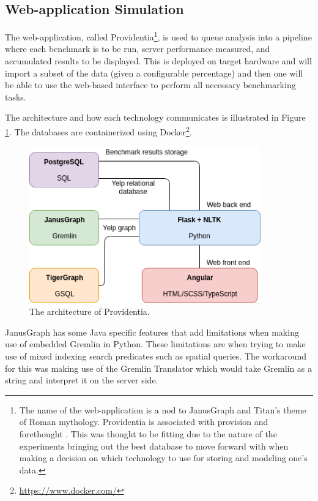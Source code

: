 \subsection{Web-application Simulation}
The web-application, called Providentia\footnote{The name of the web-application is a nod to JanusGraph and Titan's theme of Roman mythology. Providentia is associated with provision and forethought \cite{providentia-meaning}. This was thought to be fitting due to the nature of the experiments bringing out the best database to move forward with when making a decision on which technology to use for storing and modeling one's data.}, is used to queue analysis into a pipeline where each benchmark is to be run, server performance measured, and accumulated results to be displayed. This is deployed on target hardware and will import a subset of the data (given a configurable percentage) and then one will be able to use the web-based interface to perform all necessary benchmarking tasks.

The architecture and how each technology communicates is illustrated in Figure \ref{fig:providentia-architecture}. The databases are containerized using Docker\footnote{\url{https://www.docker.com/}}.

\begin{figure}[h!]
    \centering
    \includegraphics[width=10cm]{img/providentia-architecture.png}
    \caption{The architecture of Providentia.}
    \label{fig:providentia-architecture}
\end{figure}

JanusGraph has some Java specific features that add limitations when making use of embedded Gremlin in Python. These limitations are when trying to make use of mixed indexing search predicates such as spatial queries. The workaround for this was making use of the Gremlin Translator which would take Gremlin as a string and interpret it on the server side.

